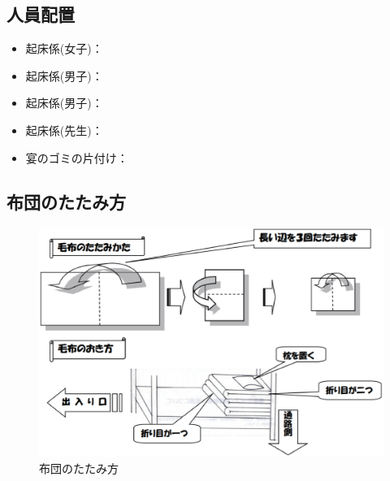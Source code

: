 \subsection{人員配置}
\begin{itemize}
\item 起床係(女子)：
\item 起床係(男子)：
\item 起床係(男子)：
\item 起床係(先生)：
\item 宴のゴミの片付け：
\end{itemize}

\clearpage

\subsection{布団のたたみ方}
\begin{figure}[h]
\begin{center}
\includegraphics[scale=0.5]{./16/futon_katazuke.eps}
\caption{布団のたたみ方}
\label{fig:futon_katazuke}
\end{center}
\end{figure}


